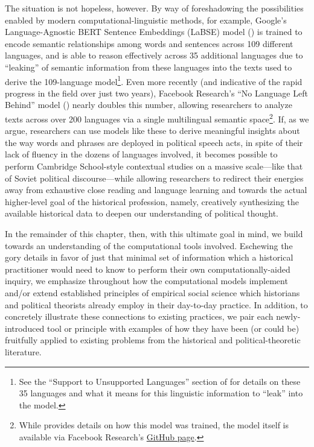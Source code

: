 \documentclass[11pt]{article}
\begin{document}
The situation is not hopeless, however. By way of foreshadowing the possibilities enabled by modern computational-linguistic methods, for example, Google's Language-Agnostic BERT Sentence Embeddings (LaBSE) model (\cite{feng_languageagnostic_2022}) is trained to encode semantic relationships among words and sentences across 109 different languages, and is able to reason effectively across 35 additional languages due to ``leaking'' of semantic information from these languages into the texts used to derive the 109-language model\footnote{See the ``Support to Unsupported Languages'' section of \cite{yang_languageagnostic_2020} for details on these 35 languages and what it means for this linguistic information to ``leak'' into the model.}. Even more recently (and indicative of the rapid progress in the field over just two years), Facebook Research's ``No Language Left Behind'' model (\cite{heffernan_bitext_2022}) nearly doubles this number, allowing researchers to analyze texts across over 200 languages via a single multilingual semantic space\footnote{While \cite{heffernan_bitext_2022} provides details on how this model was trained, the model itself is available via Facebook Research's \href{https://github.com/facebookresearch/LASER/blob/main/nllb/README.md}{GitHub page}.}. If, as we argue, researchers can use models like these to derive meaningful insights about the way words and phrases are deployed in political speech acts, in spite of their lack of fluency in the dozens of languages involved, it becomes possible to perform Cambridge School-style contextual studies on a massive scale---like that of Soviet political discourse---while allowing researchers to redirect their energies away from exhaustive close reading and language learning and towards the actual higher-level goal of the historical profession, namely, creatively synthesizing the available historical data to deepen our understanding of political thought.

In the remainder of this chapter, then, with this ultimate goal in mind, we build towards an understanding of the computational tools involved. Eschewing the gory details in favor of just that minimal set of information which a historical practitioner would need to know to perform their own computationally-aided inquiry, we emphasize throughout how the computational models implement and/or extend established principles of empirical social science which historians and political theorists already employ in their day-to-day practice. In addition, to concretely illustrate these connections to existing practices, we pair each newly-introduced tool or principle with examples of how they have been (or could be) fruitfully applied to existing problems from the historical and political-theoretic literature.
\end{document}
